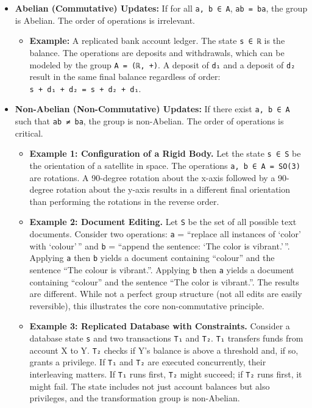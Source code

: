 \documentclass[
]{article}
\providecommand{\tightlist}{%
  \setlength{\itemsep}{0pt}\setlength{\parskip}{0pt}}
\begin{document}
\begin{itemize}
\tightlist
\item
  \textbf{Abelian (Commutative) Updates:} If for all
  \texttt{a,\ b\ ∈\ A}, \texttt{ab\ =\ ba}, the group is Abelian. The
  order of operations is irrelevant.

  \begin{itemize}
  \tightlist
  \item
    \textbf{Example:} A replicated bank account ledger. The state
    \texttt{s\ ∈\ ℝ} is the balance. The operations are deposits and
    withdrawals, which can be modeled by the group
    \texttt{A\ =\ (ℝ,\ +)}. A deposit of \texttt{d₁} and a deposit of
    \texttt{d₂} result in the same final balance regardless of order:
    \texttt{s\ +\ d₁\ +\ d₂\ =\ s\ +\ d₂\ +\ d₁}.
  \end{itemize}
\item
  \textbf{Non-Abelian (Non-Commutative) Updates:} If there exist
  \texttt{a,\ b\ ∈\ A} such that \texttt{ab\ ≠\ ba}, the group is
  non-Abelian. The order of operations is critical.

  \begin{itemize}
  \tightlist
  \item
    \textbf{Example 1: Configuration of a Rigid Body.} Let the state
    \texttt{s\ ∈\ S} be the orientation of a satellite in space. The
    operations \texttt{a,\ b\ ∈\ A\ =\ SO(3)} are rotations. A 90-degree
    rotation about the x-axis followed by a 90-degree rotation about the
    y-axis results in a different final orientation than performing the
    rotations in the reverse order.
  \item
    \textbf{Example 2: Document Editing.} Let \texttt{S} be the set of
    all possible text documents. Consider two operations: \texttt{a} =
    ``replace all instances of `color' with `colour'\,'' and \texttt{b}
    = ``append the sentence: `The color is vibrant.'\,''. Applying
    \texttt{a} then \texttt{b} yields a document containing ``colour''
    and the sentence ``The colour is vibrant.''. Applying \texttt{b}
    then \texttt{a} yields a document containing ``colour'' and the
    sentence ``The color is vibrant.''. The results are different. While
    not a perfect group structure (not all edits are easily reversible),
    this illustrates the core non-commutative principle.
  \item
    \textbf{Example 3: Replicated Database with Constraints.} Consider a
    database state \texttt{s} and two transactions \texttt{T₁} and
    \texttt{T₂}. \texttt{T₁} transfers funds from account X to Y.
    \texttt{T₂} checks if Y's balance is above a threshold and, if so,
    grants a privilege. If \texttt{T₁} and \texttt{T₂} are executed
    concurrently, their interleaving matters. If \texttt{T₁} runs first,
    \texttt{T₂} might succeed; if \texttt{T₂} runs first, it might fail.
    The state includes not just account balances but also privileges,
    and the transformation group is non-Abelian.
  \end{itemize}
\end{itemize}
\end{document}
